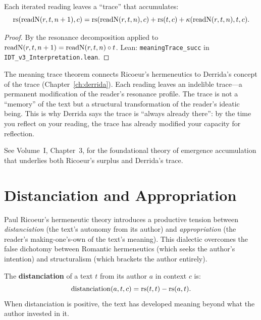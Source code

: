 \begin{theorem}
\label{thm:meaning-trace}
Each iterated reading leaves a ``trace'' that accumulates:
\[
\mathrm{rs}(\mathrm{readN}(r, t, n+1), c) = \mathrm{rs}(\mathrm{readN}(r, t, n), c)
+ \mathrm{rs}(t, c) + \kappa(\mathrm{readN}(r, t, n), t, c).
\]
\end{theorem}

\begin{proof}
By the resonance decomposition applied to $\mathrm{readN}(r, t, n+1) =
\mathrm{readN}(r, t, n) \circ t$.
Lean: \texttt{meaningTrace\_succ} in \texttt{IDT\_v3\_Interpretation.lean}.
\end{proof}

\begin{remark}
The meaning trace theorem connects Ricoeur's hermeneutics to Derrida's
concept of the trace (Chapter~\ref{ch:derrida}). Each reading leaves an
indelible trace---a permanent modification of the reader's resonance profile.
The trace is not a ``memory'' of the text but a structural transformation
of the reader's ideatic being. This is why Derrida says the trace is
``always already there'': by the time you reflect on your reading, the
trace has already modified your capacity for reflection.

See Volume~I, Chapter~3, for the foundational theory of emergence
accumulation that underlies both Ricoeur's surplus and Derrida's trace.
\end{remark}




\section{Distanciation and Appropriation}

Paul Ricoeur's hermeneutic theory introduces a productive tension between
\textit{distanciation} (the text's autonomy from its author) and
\textit{appropriation} (the reader's making-one's-own of the text's meaning).
This dialectic overcomes the false dichotomy between Romantic hermeneutics
(which seeks the author's intention) and structuralism (which brackets the
author entirely).

\begin{definition}[Distanciation]
\label{def:distanciation}
The \textbf{distanciation} of a text $t$ from its author $a$ in context $c$ is:
\[
\mathrm{distanciation}(a, t, c) = \mathrm{rs}(t, t) - \mathrm{rs}(a, t).
\]
When distanciation is positive, the text has developed meaning beyond what
the author invested in it.
\end{definition}

